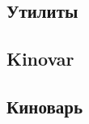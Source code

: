 \begin{RU}
\section{Утилиты}
\end{RU}

\begin{EN}
\section{Kinovar}
\subsection{}
\subsection{}
\end{EN}

\begin{RU}
\section{Киноварь}
\subsection{}
\subsection{}
\end{RU}


